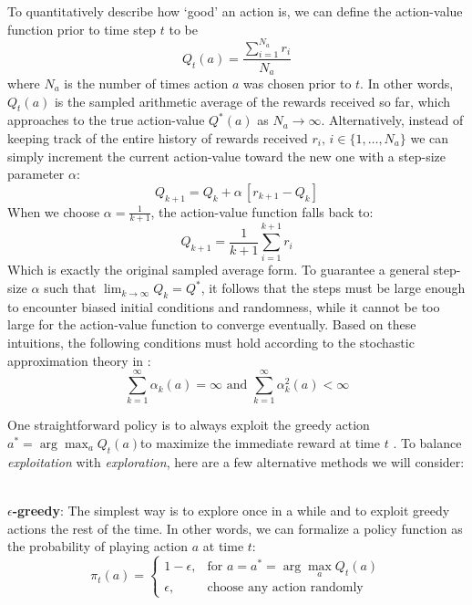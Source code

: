 \documentclass[conference]{IEEEtran}
\begin{document}
To quantitatively describe how `good' an action is, we can define the action-value function prior to time step $t$ to be
\begin{equation*}
	Q_t(a) = \frac{\sum_{i=1}^{N_a}r_i}{N_a}
\end{equation*}
\noindent where $N_a$ is the number of times action $a$ was chosen prior to $t$. In other words, $Q_t(a)$ is the sampled arithmetic average of the rewards received so far, which approaches to the true action-value $Q^{*}(a)$ as $N_a \rightarrow \infty$. Alternatively, instead of keeping track of the entire history of rewards received $r_i,\, i \in \{1,\dots,N_a\}$ we can simply increment the current action-value toward the new one with a step-size parameter $\alpha$:
\begin{equation*}
	Q_{k+1} = Q_k + \alpha\,[r_{k+1} - Q_k]
\end{equation*}
When we choose $\alpha = \frac{1}{k+1}$, the action-value function falls back to:
\begin{equation*}
	Q_{k+1} = \frac{1}{k+1} \sum_{i=1}^{k+1}r_i
\end{equation*}
\noindent Which is exactly the original sampled average form. To guarantee a  general step-size $\alpha$ such that $\lim_{k\rightarrow \infty}Q_k = Q^*$, it follows that the steps must be large enough to encounter biased initial conditions and randomness, while it cannot be too large for the action-value function to converge eventually. Based on these intuitions, the following conditions must hold according to the stochastic approximation theory in \cite{bertsekas1996}:
\begin{equation*}
	\sum_{k=1}^\infty \alpha_k(a) = \infty \text{ and } \sum_{k=1}^\infty \alpha_k^2(a) < \infty
\end{equation*}

One straightforward policy is to always exploit the greedy action $a^* = \arg\max_{a} Q_t(a)$to maximize the immediate reward at time $t$ . To balance \emph{exploitation} with \emph{exploration}, here are a few alternative methods we will consider:


\-\\
\textbf{$\epsilon$-greedy}: The simplest way is to explore once in a while and to exploit greedy actions the rest of the time. In other words, we can formalize a policy function as the probability of playing action $a$ at time $t$:
\begin{equation*}
	\pi_t(a) = 
	\begin{cases}
		1-\epsilon, & \text{for }a=a^* = \arg\max_{a} Q_t(a)\\
		\epsilon, & \text{choose any action randomly}
	\end{cases}
\end{equation*}
\end{document}
